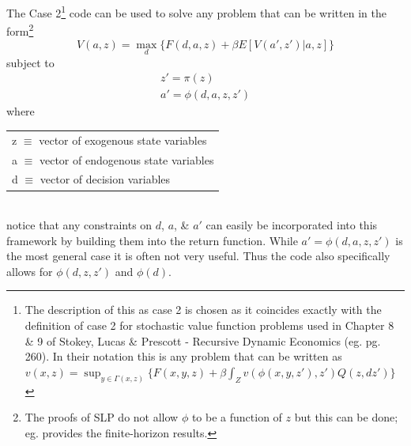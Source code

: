 The Case 2\footnote{The description of this as case 2 is chosen as it coincides exactly with the definition of case 2 for stochastic value function problems
used in Chapter 8 \& 9 of Stokey, Lucas \& Prescott - Recursive Dynamic Economics (eg. pg. 260). In their notation this is any problem that can be written as
$\textit{v}(x,z)=\sup_{y\in \Gamma(x,z)} \{ F(x,y,z) + \beta \int_Z \textit{v}(\phi (x,y,z'),z')Q(z,dz')\}$} code can be used to solve any problem that
can be written in the form\footnote{The proofs of SLP do not allow $\phi$ to be a function of $z$ but this can be done; eg. \cite*{Bertsekas1976} provides the finite-horizon results.}
\begin{equation*}
 V(a,z)= \max_{d} \{ F(d,a,z) + \beta E[V(a',z')|a,z] \}
\end{equation*}
subject to
\begin{eqnarray*}
 z'=\pi(z) \\
 a'=\phi (d,a,z,z')
\end{eqnarray*}
where \\
\begin{tabular} {l}
 z $\equiv$ vector of exogenous state variables \\
 a $\equiv$ vector of endogenous state variables \\
 d $\equiv$ vector of decision variables
\end{tabular} \\
notice that any constraints on $d$, $a$, \& $a'$ can easily be incorporated into this framework by building them into the return function.
While $a'=\phi (d,a,z,z')$ is the most general case it is often not very useful. Thus the code also specifically allows for
$\phi (d,z,z')$ and $\phi (d)$.

